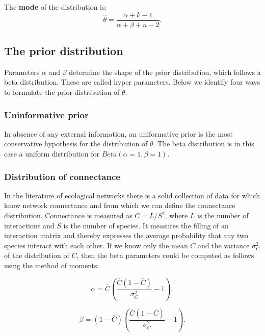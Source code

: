 ﻿\documentclass[12pt]{article}
\begin{document}
        The \textbf{mode} of the distribution is:
          \begin{equation}
            \hat{\theta} = \frac{\alpha + k - 1}{\alpha + \beta + n - 2} .
            \label{mode}
          \end{equation}

    \subsection*{The prior distribution}    

      Parameters $\alpha$ and $\beta$ determine the shape of the prior distribution, which follows a beta distribution. These are called hyper parameters. Below we identify four ways to formulate the prior distribution of $\theta$. 


      \subsubsection*{Uninformative prior}
        
          In absence of any external information, an uniformative prior is the most conservative hypothesis for the distribution of $\theta$. The beta distribution is in this case a uniform distribution  for $Beta(\alpha=1,\beta=1)$. 

      \subsubsection*{Distribution of connectance}
        
          In the literature of ecological networks there is a solid collection of data for which know network connectance and from which we can define the connectance distribution. Connectance is measured as $C = L/S^2$, where $L$ is the number of interactions and $S$ is the number of species. It measures the filling of an interaction matrix and thereby expresses the average probability that any two species interact with each other. If we know only the mean $\overline{C}$ and the variance $\sigma_C^2$ of the distribution of $C$, then the beta parameters could be computed as follows using the method of moments:

          \begin{equation}
          \alpha = \overline{C}(\frac{\overline{C}(1-\overline{C})}{\sigma_C^2}-1) ,
          \end{equation}

          \begin{equation}
          \beta = (1-\overline{C})(\frac{\overline{C}(1-\overline{C})}{\sigma_C^2}-1) .
          \end{equation}
    
\end{document}
